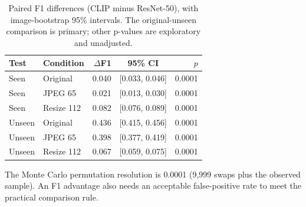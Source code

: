 \begin{table}[!htbp]\centering\resulttable
\caption{Paired F1 differences (CLIP minus ResNet-50), with image-bootstrap 95\% intervals. The original-unseen comparison is primary; other p-values are exploratory and unadjusted.}\label{tab:paired}
\begin{tabularx}{\linewidth}{@{}llrCr@{}}\toprule
Test & Condition & $\Delta$F1 & 95\% CI & $p$\\\midrule
Seen & Original & 0.040 & [0.033, 0.046] & 0.0001\\
Seen & JPEG 65 & 0.021 & [0.013, 0.030] & 0.0001\\
Seen & Resize 112 & 0.082 & [0.076, 0.089] & 0.0001\\
Unseen & Original & 0.436 & [0.415, 0.456] & 0.0001\\
Unseen & JPEG 65 & 0.398 & [0.377, 0.419] & 0.0001\\
Unseen & Resize 112 & 0.067 & [0.059, 0.075] & 0.0001\\
\bottomrule\end{tabularx}
\par\smallskip\parbox{\linewidth}{\footnotesize The Monte Carlo permutation resolution is 0.0001 (9,999 swaps plus the observed sample). An F1 advantage also needs an acceptable false-positive rate to meet the practical comparison rule.}
\end{table}

